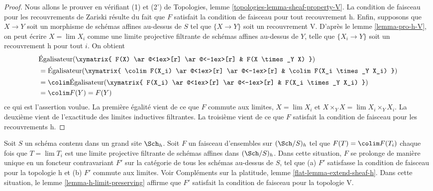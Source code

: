 \begin{proof}
Nous allons le prouver en vérifiant (1) et (2') de
Topologies, lemme \ref{topologies-lemma-sheaf-property-V}.
La condition de faisceau pour les recouvrements de Zariski résulte
du fait que $F$ satisfait la condition de faisceau pour tout recouvrement h.
Enfin, supposons que $X \to Y$ soit un morphisme de schémas affines
au-dessus de $S$ tel que $\{X \to Y\}$ soit un recouvrement V.
D'après le lemme \ref{lemma-pro-h-V}, on peut écrire $X = \lim X_i$
comme une limite projective filtrante de schémas affines
au-dessus de $Y$, telle que $\{X_i \to Y\}$ soit un recouvrement h pour tout $i$.
On obtient
\begin{align*}
&
\text{Égalisateur}(
\xymatrix{
F(X) \ar@<1ex>[r] \ar@<-1ex>[r] &
F(X \times_Y X)
}
)
\\
& =
\text{Égalisateur}(
\xymatrix{
\colim F(X_i) \ar@<1ex>[r] \ar@<-1ex>[r] &
\colim F(X_i \times_Y X_i)
}
)
\\
& =
\colim
\text{Égalisateur}(
\xymatrix{
F(X_i) \ar@<1ex>[r] \ar@<-1ex>[r] &
F(X_i \times_Y X_i)
}
)
\\
& =
\colim F(Y) = F(Y)
\end{align*}
ce qui est l'assertion voulue.
La première égalité vient de ce que $F$ commute aux limites, $X = \lim X_i$ et
$X \times_Y X = \lim X_i \times_Y X_i$.
La deuxième vient de l'exactitude des limites inductives filtrantes.
La troisième vient de ce que $F$ satisfait la condition de faisceau
pour les recouvrements h.
\end{proof}

\begin{remark}
\label{remark-h-limit-preserving}
Soit $S$ un schéma contenu dans un grand site $\Sch_h$. Soit $F$ un faisceau
d'ensembles sur $(\Sch/S)_h$ tel que $F(T) = \colim F(T_i)$ chaque fois que
$T = \lim T_i$ est une limite projective filtrante de schémas affines dans $(\Sch/S)_h$.
Dans cette situation, $F$ se prolonge de manière unique en un foncteur contravariant $F'$
sur la catégorie de tous les schémas au-dessus de $S$, tel que (a) $F'$ satisfasse la
condition de faisceau pour la topologie h et (b) $F'$ commute aux limites.
Voir Compléments sur la platitude, lemme \ref{flat-lemma-extend-sheaf-h}.
Dans cette situation, le lemme \ref{lemma-h-limit-preserving}
affirme que $F'$ satisfait
la condition de faisceau pour la topologie V.
\end{remark}







